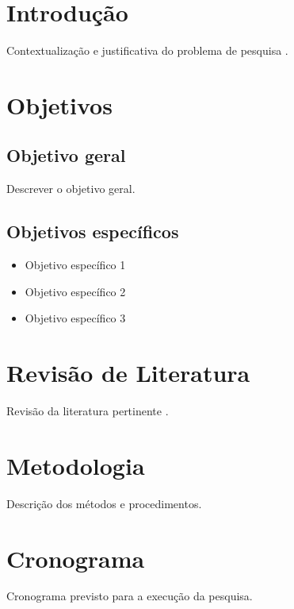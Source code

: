 \documentclass{abnt-unb-projeto-pesquisa}
\begin{document}
\imprimircapa
\imprimirfolhaderosto
\imprimirsumario

\chapter{Introdução}

Contextualização e justificativa do problema de pesquisa \cite{eco1977}.

\chapter{Objetivos}

\section{Objetivo geral}

Descrever o objetivo geral.

\section{Objetivos específicos}

\begin{itemize}
  \item Objetivo específico 1
  \item Objetivo específico 2
  \item Objetivo específico 3
\end{itemize}

\chapter{Revisão de Literatura}

Revisão da literatura pertinente \cite{medeiros2019}.

\chapter{Metodologia}

Descrição dos métodos e procedimentos.

\chapter{Cronograma}

Cronograma previsto para a execução da pesquisa.

\printbibliography
\end{document}
